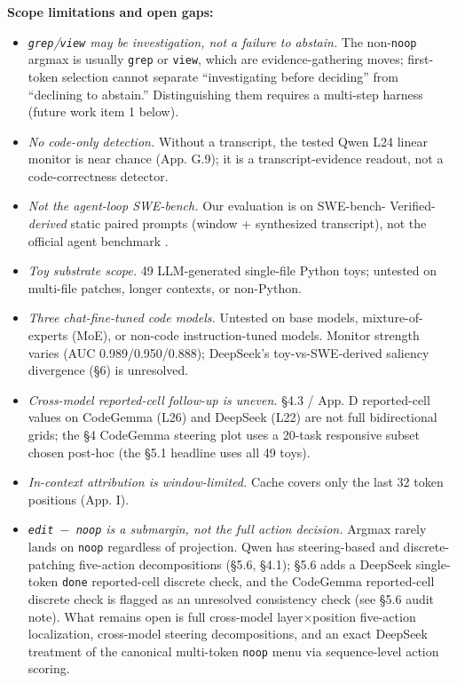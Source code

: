 \documentclass[
  11pt,
  a4paper]{article}
\providecommand{\tightlist}{%
  \setlength{\itemsep}{0pt}\setlength{\parskip}{0pt}}
\begin{document}
\textbf{Scope limitations and open gaps:}

\begin{itemize}
\tightlist
\item
  \emph{\texttt{grep}/\texttt{view} may be investigation, not a failure
  to abstain.} The non-\texttt{noop} argmax is usually \texttt{grep} or
  \texttt{view}, which are evidence-gathering moves; first-token
  selection cannot separate ``investigating before deciding'' from
  ``declining to abstain.'' Distinguishing them requires a multi-step
  harness (future work item 1 below).
\item
  \emph{No code-only detection.} Without a transcript, the tested Qwen
  L24 linear monitor is near chance (App. G.9); it is a
  transcript-evidence readout, not a code-correctness detector.
\item
  \emph{Not the agent-loop SWE-bench.} Our evaluation is on SWE-bench-
  Verified-\emph{derived} static paired prompts (window + synthesized
  transcript), not the official agent benchmark
  \citep{jimenez2024swebench}.
\item
  \emph{Toy substrate scope.} 49 LLM-generated single-file Python toys;
  untested on multi-file patches, longer contexts, or non-Python.
\item
  \emph{Three chat-fine-tuned code models.} Untested on base models,
  mixture-of-experts (MoE), or non-code instruction-tuned models.
  Monitor strength varies (AUC 0.989/0.950/0.888); DeepSeek's
  toy-vs-SWE-derived saliency divergence (\S{}6) is unresolved.
\item
  \emph{Cross-model reported-cell follow-up is uneven.} \S{}4.3 / App. D
  reported-cell values on CodeGemma (L26) and DeepSeek (L22) are not
  full bidirectional grids; the \S{}4 CodeGemma steering plot uses a
  20-task responsive subset chosen post-hoc (the \S{}5.1 headline uses all
  49 toys).
\item
  \emph{In-context attribution is window-limited.} Cache covers only the
  last 32 token positions (App. I).
\item
  \emph{\texttt{edit\ \ensuremath{-}\ noop} is a submargin, not the full action
  decision.} Argmax rarely lands on \texttt{noop} regardless of
  projection. Qwen has steering-based and discrete-patching five-action
  decompositions (\S{}5.6, \S{}4.1); \S{}5.6 adds a DeepSeek single-token
  \texttt{done} reported-cell discrete check, and the CodeGemma
  reported-cell discrete check is flagged as an unresolved consistency
  check (see \S{}5.6 audit note). What remains open is full cross-model
  layer\ensuremath{\times}position five-action localization, cross-model steering
  decompositions, and an exact DeepSeek treatment of the canonical
  multi-token \texttt{noop} menu via sequence-level action scoring.
\end{itemize}
\end{document}
